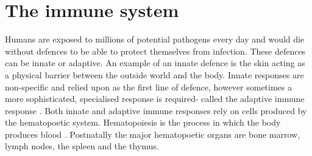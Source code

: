 \section{The immune system}
Humans are exposed to millions of potential pathogens every day and would die without defences to be able to protect themselves from infection.
These defences can be innate or adaptive.
An example of an innate defence is the skin acting as a physical barrier between the outside world and the body.
Innate responses are non-specific and relied upon as the first line of defence, however sometimes a more sophisticated, specialised response is required- called the adaptive immune response \cite{alberts2007molecularimmune}.
Both innate and adaptive immune responses rely on cells produced by the hematopoetic system.
Hematopoiesis is the process in which the body produces blood \cite{alberts2007molecularstem}.
Postnatally the major hematopoetic organs are bone marrow, lymph nodes, the spleen and the thymus.

